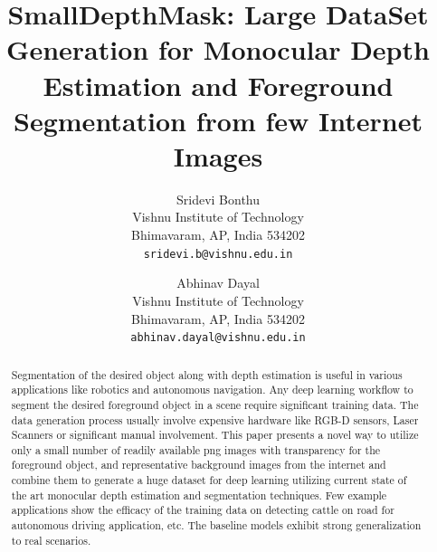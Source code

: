 \documentclass[review]{cvpr}
\begin{document}
\title{SmallDepthMask: Large DataSet Generation for Monocular Depth Estimation and Foreground Segmentation from few Internet Images}

\author{Sridevi Bonthu\\
Vishnu Institute of Technology\\
Bhimavaram, AP, India 534202\\
{\tt\small sridevi.b@vishnu.edu.in}
\and
Abhinav Dayal\\
Vishnu Institute of Technology\\
Bhimavaram, AP, India 534202\\
{\tt\small abhinav.dayal@vishnu.edu.in}
}

\maketitle

\begin{abstract}
  Segmentation of the desired object along with depth estimation is useful in various applications like robotics and autonomous navigation. 
  Any deep learning workflow to segment the desired foreground object in a scene require significant training data.
  The data generation process usually involve expensive hardware like RGB-D sensors, Laser Scanners or significant manual involvement. 
  This paper presents a novel way to utilize only a small number of readily available png images with transparency for the foreground object, 
  and representative background images from the internet and combine them to generate a huge dataset for deep learning
  utilizing current state of the art monocular depth estimation and segmentation techniques. 
  Few example applications show the efficacy of the training data on detecting 
  cattle on road for autonomous driving application, etc. The baseline models exhibit strong generalization to real scenarios.
\end{abstract}

 

\end{document}

